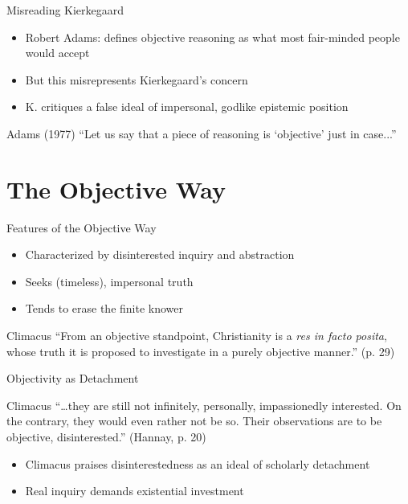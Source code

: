 \documentclass[12pt]{beamer}
\begin{document}
\begin{frame}{Misreading Kierkegaard}
\begin{itemize}
  \item Robert Adams: defines objective reasoning as what most fair-minded people would accept
  \item But this misrepresents Kierkegaard’s concern
  \item K. critiques a false ideal of impersonal, godlike epistemic position
\end{itemize}
\begin{block}{Adams (1977)}
“Let us say that a piece of reasoning is ‘objective’ just in case...”
\end{block}
\end{frame}

\section{The Objective Way}

\begin{frame}{Features of the Objective Way}
\begin{itemize}
  \item Characterized by disinterested inquiry and abstraction
  \item Seeks (timeless), impersonal truth
  \item Tends to erase the finite knower
\end{itemize}
\begin{block}{Climacus}
  ``From an objective standpoint, Christianity is a \emph{res in facto
    posita}, whose truth it is proposed to investigate in a purely
  objective manner.'' (p. 29)
\end{block}
\end{frame}


\begin{frame}{Objectivity as Detachment}
\begin{block}{Climacus}
  ``\dots they are still not infinitely, personally, impassionedly
  interested. On the contrary, they would even rather not be so. Their
  observations are to be objective, disinterested.'' (Hannay, p. 20)
\end{block}
\begin{itemize}
\item Climacus praises disinterestedness as an ideal of scholarly
  detachment
\item Real inquiry demands existential investment
\end{itemize}
\end{frame}
\end{document}
